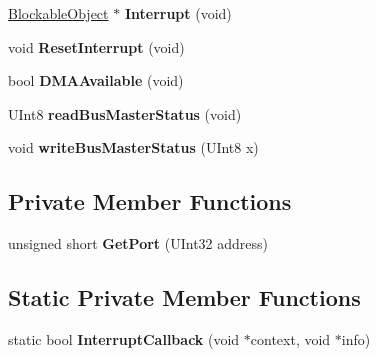 \begin{DoxyCompactItemize}
\hyperlink{class_blockable_object}{Blockable\+Object} $\ast$ {\bfseries Interrupt} (void)
\item 
\mbox{\label{class_standard_p_c___internal_1_1_legacy_a_t_a_a13e458c1159a35304eb9a117ae717105}} 
void {\bfseries Reset\+Interrupt} (void)
\item 
\mbox{\label{class_standard_p_c___internal_1_1_legacy_a_t_a_a918676981077c419161028744aced104}} 
bool {\bfseries D\+M\+A\+Available} (void)
\item 
\mbox{\label{class_standard_p_c___internal_1_1_legacy_a_t_a_af8ed06bf864ab4540140bbf7f086a92d}} 
U\+Int8 {\bfseries read\+Bus\+Master\+Status} (void)
\item 
\mbox{\label{class_standard_p_c___internal_1_1_legacy_a_t_a_a46954e018bfadd81b8d06f83ab9bda51}} 
void {\bfseries write\+Bus\+Master\+Status} (U\+Int8 x)
\end{DoxyCompactItemize}
\subsection*{Private Member Functions}
\begin{DoxyCompactItemize}
\item 
\mbox{\label{class_standard_p_c___internal_1_1_legacy_a_t_a_ad3aa129a5f83dbc7e5701b4531c9145c}} 
unsigned short {\bfseries Get\+Port} (U\+Int32 address)
\end{DoxyCompactItemize}
\subsection*{Static Private Member Functions}
\begin{DoxyCompactItemize}
\item 
\mbox{\label{class_standard_p_c___internal_1_1_legacy_a_t_a_ae49ba129ccc73a7bc5a13d8cf467451c}} 
static bool {\bfseries Interrupt\+Callback} (void $\ast$context, void $\ast$info)
\end{DoxyCompactItemize}
